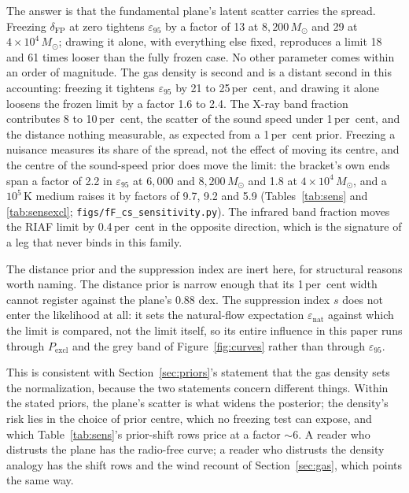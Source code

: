\documentclass[11pt]{article}
\newcommand{\msun}{\ensuremath{M_\odot}}
\newcommand{\epsl}{\ensuremath{\varepsilon_{95}}}
\begin{document}
The answer is that the fundamental plane's latent scatter carries the spread. Freezing $\delta_{\mathrm{FP}}$ at zero tightens \epsl{} by a factor of 13 at $8{,}200\,\msun$ and 29 at $4\times10^{4}\,\msun$; drawing it alone, with everything else fixed, reproduces a limit 18 and 61 times looser than the fully frozen case. No other parameter comes within an order of magnitude. The gas density is second and is a distant second in this accounting: freezing it tightens \epsl{} by 21 to 25\,per~cent, and drawing it alone loosens the frozen limit by a factor 1.6 to 2.4. The X-ray band fraction contributes 8 to 10\,per~cent, the scatter of the sound speed under 1\,per~cent, and the distance nothing measurable, as expected from a 1\,per~cent prior. Freezing a nuisance measures its share of the spread, not the effect of moving its centre, and the centre of the sound-speed prior does move the limit: the bracket's own ends span a factor of 2.2 in \epsl{} at $6{,}000$ and $8{,}200\,\msun$ and 1.8 at $4\times10^{4}\,\msun$, and a $10^{5}$\,K medium raises it by factors of 9.7, 9.2 and 5.9 (Tables~\ref{tab:sens} and \ref{tab:sensexcl}; \texttt{figs/fF\_cs\_sensitivity.py}). The infrared band fraction moves the RIAF limit by 0.4\,per~cent in the opposite direction, which is the signature of a leg that never binds in this family.

The distance prior and the suppression index are inert here, for structural reasons worth naming. The distance prior is narrow enough that its 1\,per~cent width cannot register against the plane's 0.88 dex. The suppression index $s$ does not enter the likelihood at all: it sets the natural-flow expectation $\varepsilon_{\mathrm{nat}}$ against which the limit is compared, not the limit itself, so its entire influence in this paper runs through $P_{\mathrm{excl}}$ and the grey band of Figure~\ref{fig:curves} rather than through \epsl.

This is consistent with Section~\ref{sec:priors}'s statement that the gas density sets the normalization, because the two statements concern different things. Within the stated priors, the plane's scatter is what widens the posterior; the density's risk lies in the choice of prior centre, which no freezing test can expose, and which Table~\ref{tab:sens}'s prior-shift rows price at a factor $\sim$6. A reader who distrusts the plane has the radio-free curve; a reader who distrusts the density analogy has the shift rows and the wind recount of Section~\ref{sec:gas}, which points the same way.
\end{document}
